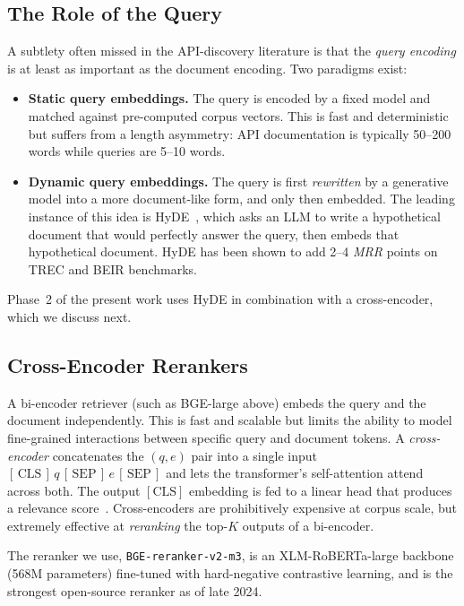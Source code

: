 \documentclass[10pt,a4paper,twocolumn]{article}
\begin{document}
\subsection{The Role of the Query}

A subtlety often missed in the API-discovery literature is that the
\emph{query encoding} is at least as important as the document
encoding. Two paradigms exist:
\begin{itemize}[leftmargin=*]
    \item \textbf{Static query embeddings.} The query is encoded by a
          fixed model and matched against pre-computed corpus vectors.
          This is fast and deterministic but suffers from a length
          asymmetry: API documentation is typically 50--200 words while
          queries are 5--10 words.
    \item \textbf{Dynamic query embeddings.} The query is first
          \emph{rewritten} by a generative model into a more
          document-like form, and only then embedded. The leading
          instance of this idea is HyDE~\cite{gao2023hyde}, which asks
          an LLM to write a hypothetical document that would perfectly
          answer the query, then embeds that hypothetical document.
          HyDE has been shown to add 2--4 \emph{MRR} points on TREC and
          BEIR benchmarks.
\end{itemize}
Phase~2 of the present work uses HyDE in combination with a
cross-encoder, which we discuss next.

\subsection{Cross-Encoder Rerankers}

A bi-encoder retriever (such as BGE-large above) embeds the query and
the document independently. This is fast and scalable but limits the
ability to model fine-grained interactions between specific query and
document tokens. A \emph{cross-encoder} concatenates the
$(q, e)$ pair into a single input
\(
  [\,\mathrm{CLS}\,]\,q\,[\,\mathrm{SEP}\,]\,e\,[\,\mathrm{SEP}\,]
\)
and lets the transformer's self-attention attend across both. The
output \([\mathrm{CLS}]\) embedding is fed to a linear head that
produces a relevance score~\cite{nogueira2019passage}. Cross-encoders
are prohibitively expensive at corpus scale, but extremely effective
at \emph{reranking} the top-\(K\) outputs of a bi-encoder.

The reranker we use, \texttt{BGE-reranker-v2-m3}, is an
XLM-RoBERTa-large backbone (568M parameters) fine-tuned with
hard-negative contrastive learning, and is the strongest open-source
reranker as of late 2024.
\end{document}
